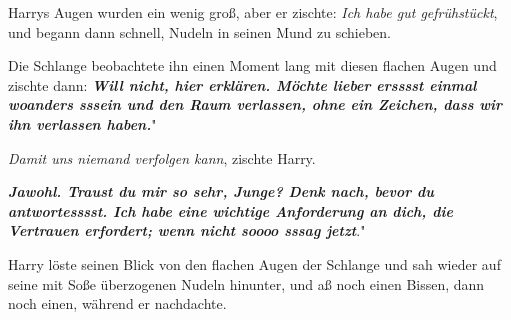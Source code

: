 Harrys Augen wurden ein wenig groß, aber er zischte: \glqq{}\emph{Ich habe gut
gefrühstückt}\grqq{}, und begann dann schnell, Nudeln in seinen Mund zu
schieben.

Die Schlange beobachtete ihn einen Moment lang mit diesen flachen Augen und
zischte dann: \glqq{}\textbf{\emph{Will nicht, hier erklären. Möchte lieber
ersssst einmal woanders sssein und den Raum verlassen, ohne ein Zeichen, dass
wir ihn verlassen haben.}}"

\glqq{}\emph{Damit uns niemand verfolgen kann}\grqq{}, zischte Harry.

\glqq{}\textbf{\emph{Jawohl. Traust du mir so sehr, Junge? Denk nach, bevor du
antwortesssst. Ich habe eine wichtige Anforderung an dich, die Vertrauen
erfordert; wenn nicht soooo sssag jetzt}}."

Harry löste seinen Blick von den flachen Augen der Schlange und sah wieder auf
seine mit Soße überzogenen Nudeln hinunter, und aß noch einen Bissen, dann noch
einen, während er nachdachte.

